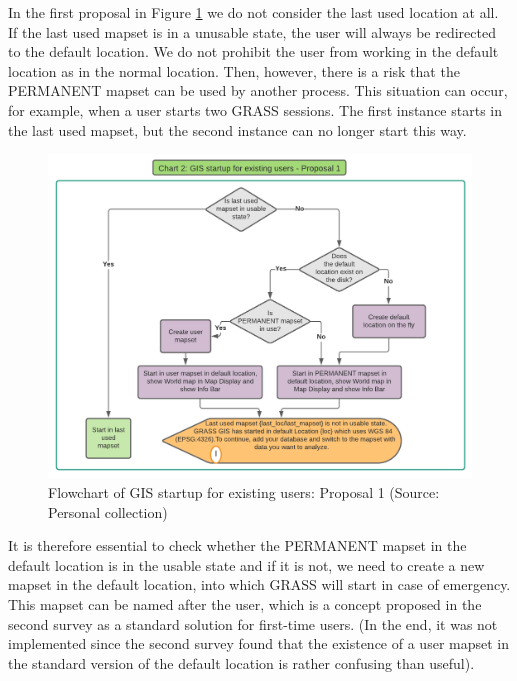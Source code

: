 \documentclass[a4paper,10pt,twoside]{article}
\begin{document}
\newpage
In the first proposal in Figure \ref{fig:normal_user_diagram} we do
not consider the last used location at all. If the last used mapset is
in a unusable state, the user will always be redirected to the
default location. We do not prohibit the user from working in the
default location as in the normal location. Then, however, there is a
risk that the PERMANENT mapset can be used by another process. This
situation can occur, for example, when a user starts two GRASS
sessions. The first instance starts in the last used mapset, but the
second instance can no longer start this way.

\vspace{0.3cm}
\begin{figure}[hbt!] 
\begin{center}
\includegraphics[width=16.5cm]{../pictures/normal_user_diagram.png} 
\caption[Flowchart of GIS startup for existing users: Proposal 1]{Flowchart of GIS startup for existing users: Proposal 1 (Source: Personal collection)}
\label{fig:normal_user_diagram}
\end{center}
\end{figure}

\noindent It is therefore essential to check whether the PERMANENT
mapset in the default location is in the usable state and if it is
not, we need to create a new mapset in the default location, into
which GRASS will start in case of emergency. This mapset can be named
after the user, which is a concept proposed in the second survey as a
standard solution for first-time users. (In the end, it was not
implemented since the second survey found that the existence of a user
mapset in the standard version of the default location is rather
confusing than useful).
\end{document}
